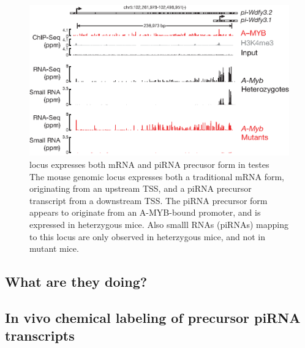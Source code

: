     \begin{figure} %
      \centering 
      \includegraphics{Figures/Discussion/pi-wdfy3.eps}
      \caption[\wdfy{} locus expresses both mRNA and piRNA precusor form in testes]
      {\wdfy{} locus expresses both mRNA and piRNA precusor form in testes\\[0.25cm]
        The mouse genomic locus \wdfy{} expresses both a traditional mRNA form, originating from an upstream TSS, and a piRNA precursor transcript from a downstream TSS. The piRNA precursor form appears to originate from an A-MYB-bound promoter, and is expressed in \amyb{} heterzygous mice. Also smalll RNAs (piRNAs) mapping to this locus are only observed in \amyb{} heterzygous mice, and not in \amyb{} mutant mice.
        }
      \label{Disc:fig:wdfy3}
      \end{figure}


  \subsection{What are they doing?}\label{Disc:subsec:What are piRNAs doing}


  \subsection{In vivo chemical labeling of precursor piRNA transcripts}\label{Disc:subsec:Labeling of precursors}


